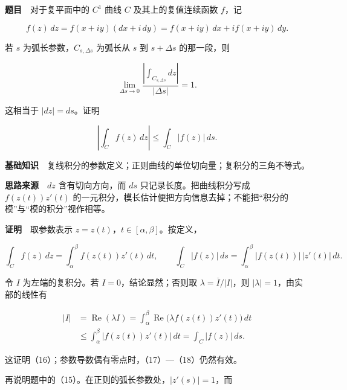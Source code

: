 \documentclass[11pt,a4paper]{article}
\begin{document}
\textbf{题目}　对于复平面中的 \(C^1\) 曲线 \(C\) 及其上的复值连续函数
\(f\)，记

\begin{equation}
f(z)\,dz=f(x+iy)(dx+i\,dy)
=f(x+iy)\,dx+i f(x+iy)\,dy.
\tag{14}
\end{equation}

若 \(s\) 为弧长参数，\(C_{s,\Delta s}\) 为弧长从 \(s\) 到 \(s+\Delta s\)
的那一段，则

\begin{equation}
\lim_{\Delta s\to0}
\frac{\left|\int_{C_{s,\Delta s}}dz\right|}{|\Delta s|}=1.
\tag{15}
\end{equation}

这相当于 \(|dz|=ds\)。证明

\begin{equation}
\left|\int_C f(z)\,dz\right|\le\int_C|f(z)|\,ds.
\tag{16}
\end{equation}

\textbf{基础知识}　复线积分的参数定义；正则曲线的单位切向量；复积分的三角不等式。

\textbf{思路来源}　\(dz\) 含有切向方向，而 \(ds\)
只记录长度。把曲线积分写成 \(f(z(t))z'(t)\)
的一元积分，模长估计便把方向信息去掉；不能把``积分的模''与``模的积分''视作相等。

\textbf{证明}　取参数表示 \(z=z(t)\)，\(t\in[\alpha,\beta]\)。按定义，

\begin{equation}
\int_C f(z)\,dz=\int_\alpha^\beta f(z(t))z'(t)\,dt,
\qquad
\int_C|f(z)|\,ds=\int_\alpha^\beta|f(z(t))|\,|z'(t)|\,dt.
\tag{17}
\end{equation}

令 \(I\) 为左端的复积分。若 \(I=0\)，结论显然；否则取
\(\lambda=\overline I/|I|\)，则 \(|\lambda|=1\)，由实部的线性有

\begin{equation}
\begin{aligned}
|I|&=\operatorname{Re}(\lambda I)
=\int_\alpha^\beta\operatorname{Re}\big(\lambda f(z(t))z'(t)\big)\,dt\\
&\le\int_\alpha^\beta|f(z(t))z'(t)|\,dt
=\int_C|f(z)|\,ds.
\end{aligned}
\tag{18}
\end{equation}

这证明（16）；参数导数偶有零点时，（17）---（18）仍然有效。

再说明题中的（15）。在正则的弧长参数处，\(|z'(s)|=1\)，而
\end{document}
